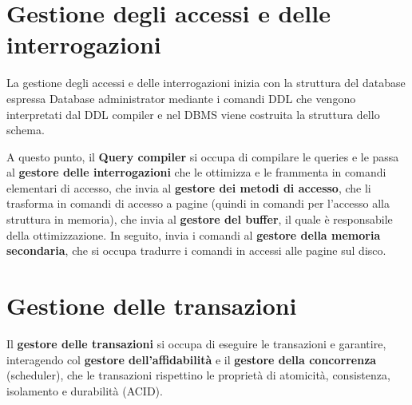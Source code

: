 \section{Gestione degli accessi e delle interrogazioni}
La gestione degli accessi e delle interrogazioni inizia con la struttura del database
espressa Database administrator mediante i comandi DDL che vengono interpretati
dal DDL compiler e nel DBMS viene costruita la struttura dello schema.

A questo punto, il \textbf{Query compiler} si occupa di compilare le queries e le
passa al \textbf{gestore delle interrogazioni} che le ottimizza e le frammenta in
comandi elementari di accesso, che invia al \textbf{gestore dei metodi di accesso},
che li trasforma in comandi di accesso a pagine (quindi in comandi per l'accesso
alla struttura in memoria), che invia al \textbf{gestore del buffer}, il quale è
responsabile della ottimizzazione. In seguito, invia i comandi al \textbf{gestore
      della memoria secondaria}, che si occupa tradurre i comandi in accessi alle
pagine sul disco.
\section{Gestione delle transazioni}
Il \textbf{gestore delle transazioni} si occupa di eseguire le transazioni e
garantire, interagendo col \textbf{gestore dell'affidabilità} e il \textbf{gestore
      della concorrenza} (scheduler), che le transazioni rispettino le proprietà
di atomicità, consistenza, isolamento e durabilità (ACID).
